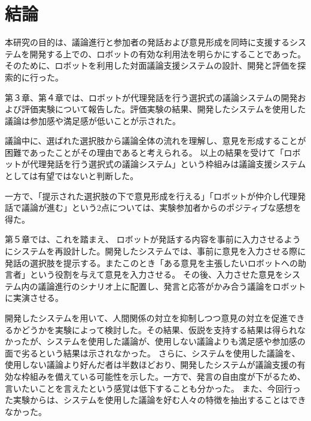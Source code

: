 \documentclass[11pt, a4paper]{jreport} %
\begin{document}







%


\chapter{結論}
本研究の目的は、議論進行と参加者の発話および意見形成を同時に支援するシステムを開発する上での、ロボットの有効な利用法を明らかにすることであった。そのために、ロボットを利用した対面議論支援システムの設計、開発と評価を探索的に行った。


第３章、第４章では、ロボットが代理発話を行う選択式の議論システムの開発および評価実験について報告した。評価実験の結果、開発したシステムを使用した議論は参加感や満足感が低いことが示された。

議論中に、選ばれた選択肢から議論全体の流れを理解し、意見を形成することが困難であったことがその理由であると考えられる。
以上の結果を受けて「ロボットが代理発話を行う選択式の議論システム」という枠組みは議論支援システムとしては有望ではないと判断した。

一方で、「提示された選択肢の下で意見形成を行える」「ロボットが仲介し代理発話で議論が進む」という2点については、実験参加者からのポジティブな感想を得た。


第５章では、これを踏まえ、
ロボットが発話する内容を事前に入力させるようにシステムを再設計した。開発したシステムでは、事前に意見を入力させる際に発話の選択肢を提示する。またこのとき「ある意見を主張したいロボットへの助言者」という役割を与えて意見を入力させる。
その後、入力させた意見をシステム内の議論進行のシナリオ上に配置し、発言と応答がかみ合う議論をロボットに実演させる。




開発したシステムを用いて、人間関係の対立を抑制しつつ意見の対立を促進できるかどうかを実験によって検討した。その結果、仮説を支持する結果は得られなかったが、システムを使用した議論が、使用しない議論よりも満足感や参加感の面で劣るという結果は示されなかった。
さらに、システムを使用した議論を、使用しない議論より好んだ者は半数ほどおり、開発したシステムが議論支援の有効な枠組みを備えている可能性を示した。一方で、発言の自由度が下がるため、言いたいことを言えたという感覚は低下することも分かった。%
また、今回行った実験からは、システムを使用した議論を好む人々の特徴を抽出することはできなかった。
\end{document}
